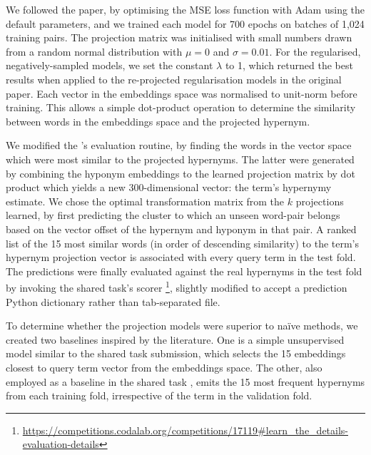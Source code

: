 We followed the paper, by optimising the MSE loss function with Adam \citep{kingma2014adam} using the default parameters, and we trained each model for 700 epochs on batches of 1,024 training pairs. The projection matrix was initialised with small numbers drawn from a random normal distribution with $\mu=0$ and $\sigma=0.01$.  For the regularised, negatively-sampled models, we set the constant $\lambda$ to 1, which returned the best results when applied to the re-projected regularisation models in the original paper.  Each vector in the embeddings space was normalised to unit-norm before training.  This allows a simple dot-product operation to determine the similarity between words in the embeddings space and the projected hypernym.

We modified the \citeauthor{ustalov2017negative}'s evaluation routine, by finding the words in the vector space which were most similar to the projected hypernyms.  The latter were generated by combining the hyponym embeddings to the learned projection matrix by dot product which yields a new 300-dimensional vector: the term's hypernymy estimate.  We chose the optimal transformation matrix from the $k$ projections learned, by first predicting the cluster to which an unseen word-pair belongs based on the vector offset of the hypernym and hyponym in that pair.  A ranked list of the 15 most similar words (in order of descending similarity) to the term's hypernym projection vector is associated with every query term in the test fold.  The predictions were finally evaluated against the real hypernyms in the test fold by invoking the shared task's scorer \footnote{\url{https://competitions.codalab.org/competitions/17119\#learn_the_details-evaluation-details}}, slightly modified to accept a prediction Python dictionary rather than tab-separated file.  

To determine whether the projection models were superior to na\"ive methods, we created two baselines inspired by the literature.  One is a simple unsupervised model similar to the \cite{maldonado2018adapt} shared task submission, which selects the 15 embeddings closest to query term vector from the embeddings space.  The other, also employed as a baseline in the shared task \citep{camacho2018semeval}, emits the 15 most frequent hypernyms from each training fold, irrespective of the term in the validation fold.  

